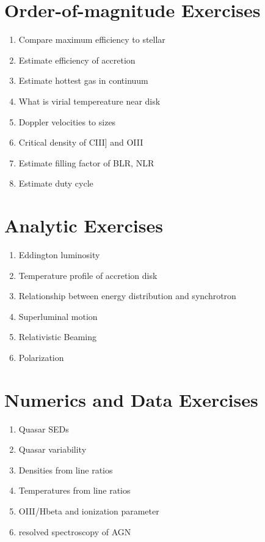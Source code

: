 \citet{gunn06a}

\section{Order-of-magnitude Exercises}

\begin{enumerate} 
\item Compare maximum efficiency to stellar
\item Estimate efficiency of accretion
\item Estimate hottest gas in continuum
\item What is virial tempereature near disk
\item Doppler velocities to sizes
\item Critical density of CIII] and OIII
\item Estimate filling factor of BLR, NLR
\item Estimate duty cycle
\end{enumerate} 

\section{Analytic Exercises}

\begin{enumerate}
\item Eddington luminosity
\item Temperature profile of accretion disk
\item Relationship between energy distribution and synchrotron
\item Superluminal motion
\item Relativistic Beaming
\item Polarization
\end{enumerate}

\section{Numerics and Data Exercises}

\begin{enumerate}
\item Quasar SEDs
\item Quasar variability
\item Densities from line ratios
\item Temperatures from line ratios
\item OIII/Hbeta and ionization parameter
\item resolved spectroscopy of AGN
\end{enumerate}


  
